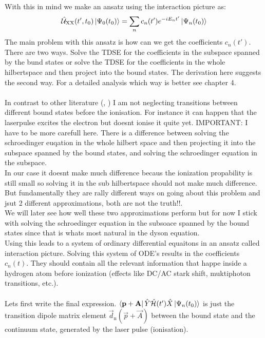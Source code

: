 With this in mind we make an ansatz using the interaction picture as:
\begin{equation*}
    \hat{\mathcal{U}}_{\mathrm{XX}}(t',t_0)\ket{\Psi_0(t_0)} = \sum_{n}c_n(t')e^{-iE_nt'}\ket{\Psi_n(t_0)}
\end{equation*}
The main problem with this ansatz is how can we get the coefficients $c_n(t')$. 
There are two ways. 
Solve the TDSE for the coefficients in the subspace spanned by the bund states or solve the TDSE for the coefficients in the whole hilbertspace and then project into the bound states.
The derivation here suggests the second way. 
For a detailed analysis which way is better see chapter 4.\\\\
In contrast to other literature (\cite{Theory_NPS}, \cite{Ivanov20012005}) I am not neglecting transitions between different bound states before the ionisation. 
For instance it can happen that the laserpulse excites the electron but doesnt ionise it quite yet. 
IMPORTANT: I have to be more carefull here. There is a difference between solving the schroedinger euqation in the whole hilbert space and then projecting it into the subspace spanned by the bound states,
and solving the schroedinger equation in the subspace.\\
In our case it doesnt make much difference becaus the ionization propability is still small so solving it in the sub hilbertspace should not make much difference.
But fundamentally they are rally different ways on going about this problem and jsut 2 different approximations, both are not the truth!!.\\
We will later see how well these two approximations perform but for now I stick with solving the schroedinger equation in the subsoace spanned by the bound states since that is whats most natural in the dyson equation.\\
Using this leads to a system of ordinary differential equaitons in an ansatz called interaction picture. Solving this system of ODE's results in the coefficients $c_n(t)$. 
They should contain all the relevant information that happe inside a hydrogen atom before ionization (effects like DC/AC stark shift, muktiphoton transitions, etc.).\\\\
Lets first write the final expression.
$\bra{\mathbf{p}+\mathbf{A}}\hat{Y}\hat{\mathcal{H}}(t')\hat{X}\ket{\Psi_n(t_0)}$ is just the transition dipole matrix element $\vec{d}_{\mathrm{n}}(\vec{p}+\vec{A})$ between the bound state and the continuum state, generated by the laser pulse (ionisation).
